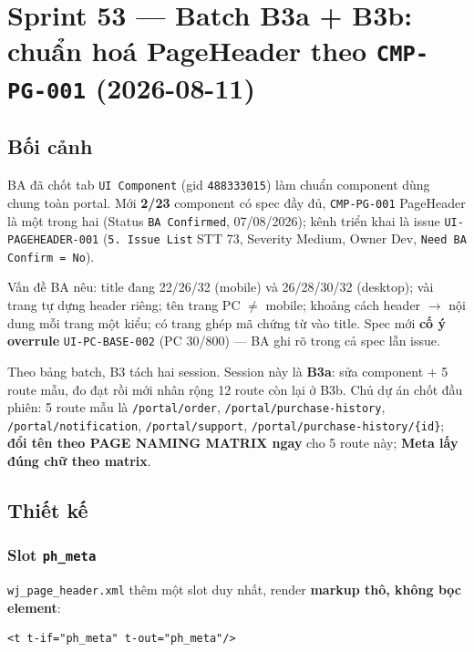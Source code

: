 \chapter{Sprint 53 --- Batch B3a + B3b: chuẩn hoá PageHeader theo \texttt{CMP-PG-001} (2026-08-11)}

\section{Bối cảnh}

BA đã chốt tab \texttt{UI Component} (gid \texttt{488333015}) làm chuẩn component dùng chung
toàn portal. Mới \textbf{2/23} component có spec đầy đủ, \texttt{CMP-PG-001} PageHeader là một
trong hai (Status \texttt{BA Confirmed}, 07/08/2026); kênh triển khai là issue
\texttt{UI-PAGEHEADER-001} (\texttt{5. Issue List} STT 73, Severity Medium, Owner Dev,
\texttt{Need BA Confirm = No}).

Vấn đề BA nêu: title đang 22/26/32 (mobile) và 26/28/30/32 (desktop); vài trang tự dựng header
riêng; tên trang PC $\neq$ mobile; khoảng cách header $\rightarrow$ nội dung mỗi trang một
kiểu; có trang ghép mã chứng từ vào title. Spec mới \textbf{cố ý overrule}
\texttt{UI-PC-BASE-002} (PC 30/800) --- BA ghi rõ trong cả spec lẫn issue.

Theo bảng batch, B3 tách hai session. Session này là \textbf{B3a}: sửa component $+$ 5 route
mẫu, đo đạt rồi mới nhân rộng 12 route còn lại ở B3b. Chủ dự án chốt đầu phiên: 5 route mẫu là
\texttt{/portal/order}, \texttt{/portal/purchase-history}, \texttt{/portal/notification},
\texttt{/portal/support}, \texttt{/portal/purchase-history/\{id\}}; \textbf{đổi tên theo PAGE
NAMING MATRIX ngay} cho 5 route này; \textbf{Meta lấy đúng chữ theo matrix}.

\section{Thiết kế}

\subsection{Slot \texttt{ph\_meta}}

\texttt{wj\_page\_header.xml} thêm một slot duy nhất, render \textbf{markup thô, không bọc
element}:

\begin{verbatim}
<t t-if="ph_meta" t-out="ph_meta"/>
\end{verbatim}

